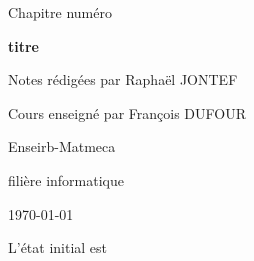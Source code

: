

\newcommand{\titrechapitre}{titre}
\newcommand{\numerochapitre}{numéro}

\renewcommand{\headrulewidth}{0.4pt}
\renewcommand{\footrulewidth}{0.4pt}
\fancyfoot[C]{\thepage}
\fancyhead[R]{\titrechapitre}




\setlength{\headheight}{15pt}
\begin{titlepage}
    \centering
    \vspace*{3cm}
    {\huge Chapitre \numerochapitre\par}
    {\Huge \bfseries\titrechapitre\par}
    \vspace{2cm}
    {\Large Notes rédigées par Raphaël JONTEF\par}
    \vspace{0.5cm}
    {\normalsize Cours enseigné par François DUFOUR\par}
    \vspace{4cm}
    {\small Enseirb-Matmeca\par}
    {\small filière informatique\par}
    \vfill
    {\large \today\par}
\end{titlepage}

\tableofcontents
\newpage



L'état initial est 
\begin{enumeratebf}
    \item {}
    \item {}
    \item {}
    \item {}
    \item {}
\end{enumeratebf}

